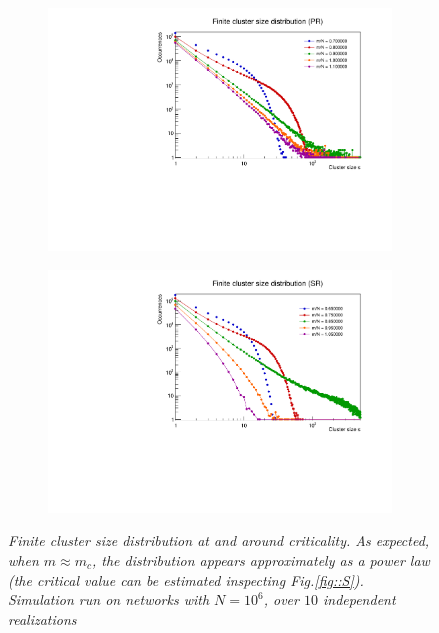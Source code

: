 \begin{figure}
	\begin{subfigure}[b]{0.48\linewidth}
		\includegraphics[width=\linewidth]{images/ClusterDistrPR.pdf}
	\end{subfigure}
	\hspace{0.5em}
	\begin{subfigure}[b]{0.48\linewidth}
		\includegraphics[width=\linewidth]{images/ClusterDistrSR.pdf}
	\end{subfigure}
	\caption{\textit{Finite cluster size distribution at and around criticality. As expected, when $m \approx m_c$, the distribution appears approximately as a power law (the critical value can be estimated inspecting Fig.\ref{fig::S}). Simulation run on networks with $N = 10^6$, over $10$ independent realizations}}
	\label{fig:ClusterDistr}
\end{figure}

